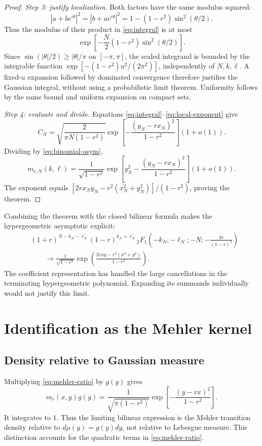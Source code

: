 \documentclass[11pt,reqno]{amsart}
\theoremstyle{remark}\newtheorem{remark}[theorem]{Remark}
\begin{document}
\begin{proof}
\smallskip\noindent\emph{Step 3: justify localization.}
Both factors have the same modulus squared:
\[
|a+be^{i\theta}|^2=|b+ae^{i\theta}|^2
=1-(1-r^2)\sin^2(\theta/2).
\]
Thus the modulus of their product in \eqref{eq:integral} is at most
\[
\exp\left[-\frac N2(1-r^2)\sin^2(\theta/2)\right].
\]
Since $\sin(|\theta|/2)\ge |\theta|/\pi$ on $[-\pi,\pi]$, the scaled
integrand is bounded by the integrable function
$\exp[-(1-r^2)u^2/(2\pi^2)]$, independently of $N,k,\ell$.
A fixed-$u$ expansion followed by dominated convergence therefore
justifies the Gaussian integral, without using a probabilistic limit
theorem. Uniformity follows by the same bound and uniform expansion
on compact sets.

\smallskip\noindent\emph{Step 4: evaluate and divide.}
Equations \eqref{eq:integral}--\eqref{eq:local-exponent} give
\begin{equation}\label{eq:numerator-asym}
C_N=\sqrt{\frac{2}{\pi N(1-r^2)}}
\exp\left[-\frac{(y_N-rx_N)^2}{1-r^2}\right](1+o(1)).
\end{equation}
Dividing by \eqref{eq:binomial-asym},
\[
m_{r,N}(k,\ell)
=\frac1{\sqrt{1-r^2}}
\exp\left[y_N^2-\frac{(y_N-rx_N)^2}{1-r^2}\right](1+o(1)).
\]
The exponent equals
$[2rx_Ny_N-r^2(x_N^2+y_N^2)]/(1-r^2)$, proving the theorem.
\end{proof}

Combining the theorem with the closed bilinear formula makes the
hypergeometric asymptotic explicit:
\begin{equation}\label{eq:hypergeo-limit}
\begin{aligned}
&(1+r)^{N-k_N-\ell_N}(1-r)^{k_N+\ell_N}
{}_2F_1\left(-k_N,-\ell_N;-N;-\frac{4r}{(1-r)^2}\right)\\
&\hspace{2em}\longrightarrow
\frac1{\sqrt{1-r^2}}
\exp\left(\frac{2rxy-r^2(x^2+y^2)}{1-r^2}\right).
\end{aligned}
\end{equation}
The coefficient representation has handled the large cancellations in
the terminating hypergeometric polynomial. Expanding its summands
individually would not justify this limit.

\section{Identification as the Mehler kernel}
\subsection{Density relative to Gaussian measure}
Multiplying \eqref{eq:mehler-ratio} by $g(y)$ gives
\begin{equation}\label{eq:gaussian-transition}
m_r(x,y)g(y)=\frac1{\sqrt{\pi(1-r^2)}}
\exp\left[-\frac{(y-rx)^2}{1-r^2}\right].
\end{equation}
It integrates to $1$. Thus the limiting bilinear expression is the
Mehler transition density relative to $d\mu(y)=g(y)dy$, not relative
to Lebesgue measure. This distinction accounts for the quadratic terms
in \eqref{eq:mehler-ratio}.
\end{document}
